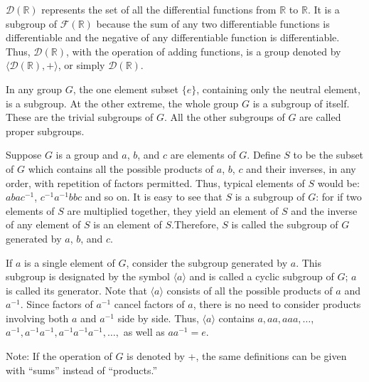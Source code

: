 \documentclass[12pt]{article}
\newcommand{\inverse}[1]{#1 ^{-1}}
\newcommand{\set}[1]{\{ #1 \}}
\newcommand{\group}[2]{\langle #1, #2 \rangle}
\newcommand{\reals}{\mathds{R}}
\begin{document}
\begin{example} $\mathscr{D}(\reals)$ represents the set of all the differential functions from $\reals$ to $\reals$. It is a subgroup of $\mathscr{F}(\reals)$ because the sum of any two differentiable functions is differentiable and the negative of any differentiable function is differentiable. Thus, $\mathscr{D}(\reals)$, with the operation of adding functions, is a group denoted by $\group{\mathscr{D}(\reals)}{+}$, or simply $\mathscr{D}(\reals)$.\end{example} 

\begin{definition} In any group $G$, the one element subset $\set{e}$, containing only the neutral element, is a subgroup. At the other extreme, the whole group $G$ is a subgroup of itself. These are the trivial subgroups of $G$. All the other subgroups of $G$ are called proper subgroups. \end{definition} 

\begin{definition} Suppose $G$ is a group and $a$, $b$, and $c$ are elements of $G$. Define $S$ to be the subset of $G$ which contains all the possible products of $a$, $b$, $c$ and their inverses, in any order, with repetition of factors permitted. Thus, typical elements of $S$ would be: $aba\inverse{c}$, $\inverse{c}\inverse{a}bbc$ and so on. It is easy to see that $S$ is a subgroup of $G$: for if two elements of $S$ are multiplied together, they yield an element of $S$ and the inverse of any element of $S$ is an element of $S$.Therefore, $S$ is called the subgroup of $G$ generated by $a$, $b$, and $c$. \end{definition} 

\begin{definition} If $a$ is a single element of $G$, consider the subgroup generated by $a$. This subgroup is designated by the symbol $\langle a \rangle$ and is called a cyclic subgroup of $G$; $a$ is called its generator. Note that $\langle a \rangle $ consists of all the possible products of $a$ and $\inverse{a}$. Since factors of $\inverse{a}$ cancel factors of $a$, there is no need to consider products involving both $a$ and $\inverse{a}$ side by side. Thus, $\langle a \rangle$ contains $a, aa, aaa, \dots$, $\inverse{a}, \inverse{a}\inverse{a}, \inverse{a}\inverse{a}\inverse{a}, \dots, $ as well as $a\inverse{a} = e$. \end{definition} 

Note: If the operation of $G$ is denoted by +, the same definitions can be given with ``sums'' instead of ``products.'' 
\end{document}
